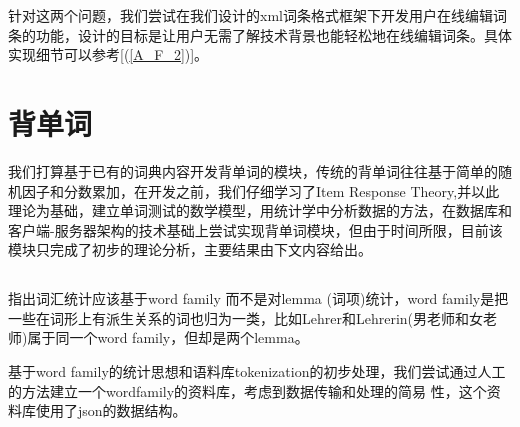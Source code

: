 \documentclass[12pt]{article}
\begin{document}
针对这两个问题，我们尝试在我们设计的xml词条格式框架下开发用户在线编辑词条的功能，设计的目标是让用户无需了解技术背景也能轻松地在线编辑词条。具体实现细节可以参考[(\ref{A_F_2})]。

\section{背单词}
我们打算基于已有的词典内容开发背单词的模块，传统的背单词往往基于简单的随机因子和分数累加，在开发之前，我们仔细学习了Item Response
Theory,并以此理论为基础，建立单词测试的数学模型，用统计学中分析数据的方法，在数据库和客户端-服务器架构的技术基础上尝试实现背单词模块，但由于时间所限，目前该模块只完成了初步的理论分析，主要结果由下文内容给出。
\subsection{\textbf{}}
\cite{Bib4}指出词汇统计应该基于word family 而不是对lemma (词项)统计，word family是把一些在词形上有派生关系的词也归为一类，比如Lehrer和Lehrerin(男老师和女老师)属于同一个word family，但却是两个lemma。

基于word family的统计思想和语料库tokenization的初步处理，我们尝试通过人工的方法建立一个wordfamily的资料库，考虑到数据传输和处理的简易
性，这个资料库使用了json的数据结构。
\end{document}
